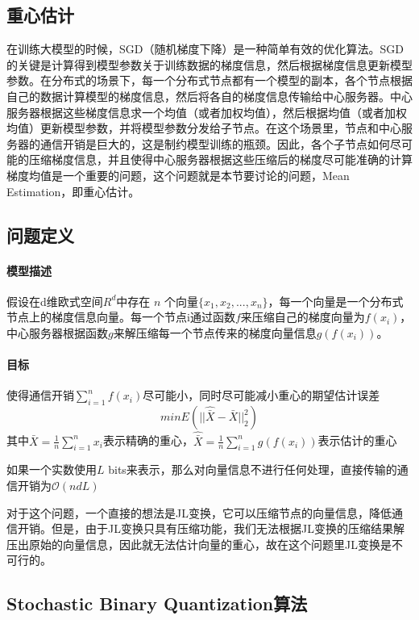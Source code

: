 \documentclass[lang=cn,newtx,10pt,scheme=chinese,chinesefont=nofont,citestyle=gb7714-2015, bibstyle=gb7714-2015]{elegantbook}
\begin{document}
\begin{refsection}
\section{重心估计}
在训练大模型的时候，SGD（随机梯度下降）是一种简单有效的优化算法。SGD的关键是计算得到模型参数关于训练数据的梯度信息，然后根据梯度信息更新模型参数。在分布式的场景下，每一个分布式节点都有一个模型的副本，各个节点根据自己的数据计算模型的梯度信息，然后将各自的梯度信息传输给中心服务器。中心服务器根据这些梯度信息求一个均值（或者加权均值），然后根据均值（或者加权均值）更新模型参数，并将模型参数分发给子节点。在这个场景里，节点和中心服务器的通信开销是巨大的，这是制约模型训练的瓶颈。因此，各个子节点如何尽可能的压缩梯度信息，并且使得中心服务器根据这些压缩后的梯度尽可能准确的计算梯度均值是一个重要的问题，这个问题就是本节要讨论的问题，Mean Estimation，即重心估计。


\subsection{问题定义}

\paragraph{模型描述} 假设在d维欧式空间$R^d$中存在 $n$ 个向量$\{x_{1},x_{2},...,x_{n}\}$，每一个向量是一个分布式节点上的梯度信息向量。每一个节点i通过函数$f$来压缩自己的梯度向量为$f(x_{i})$，中心服务器根据函数$g$来解压缩每一个节点传来的梯度向量信息$g(f(x_{i}))$。

\paragraph{目标} 使得通信开销$\sum_{i=1}^n f(x_{i})$尽可能小，同时尽可能减小重心的期望估计误差
\[min E(||\hat{\bar{X}} - \bar{X}||_{2}^2)\]
其中$\bar{X} = \frac{1}{n} \sum_{i=1}^n x_{i}$表示精确的重心，$\hat{\bar{X}} =  \frac{1}{n} \sum_{i=1}^n g(f(x_{i}))$表示估计的重心

如果一个实数使用$L$ bits来表示，那么对向量信息不进行任何处理，直接传输的通信开销为$\mathcal{O}(ndL)$

\begin{remark}
对于这个问题，一个直接的想法是JL变换，它可以压缩节点的向量信息，降低通信开销。但是，由于JL变换只具有压缩功能，我们无法根据JL变换的压缩结果解压出原始的向量信息，因此就无法估计向量的重心，故在这个问题里JL变换是不可行的。 
\end{remark}

\subsection{Stochastic Binary Quantization算法}


\end{refsection}
\end{document}
